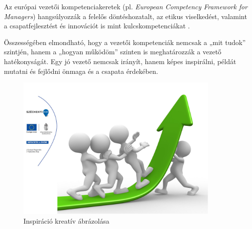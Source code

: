 Az európai vezetői kompetenciakeretek (pl. \textit{European Competency Framework for Managers}) 
hangsúlyozzák a felelős döntéshozatalt, az etikus viselkedést, valamint a csapatfejlesztést és innovációt is mint kulcskompetenciákat \cite{ecfm2010}.

Összességében elmondható, hogy a vezetői kompetenciák nemcsak a „mit tudok” szintjén, 
hanem a „hogyan működöm” szinten is meghatározzák a vezető hatékonyságát. 
Egy jó vezető nemcsak irányít, hanem képes inspirálni, példát mutatni és fejlődni önmaga és a csapata érdekében.
\begin{figure}[H]
	\centering
    \includegraphics[width=100mm, keepaspectratio]{figures/inspiration.jpg}
    \caption{Inspiráció kreatív ábrázolása}
    \label {fig:inspiration}
\end{figure}

